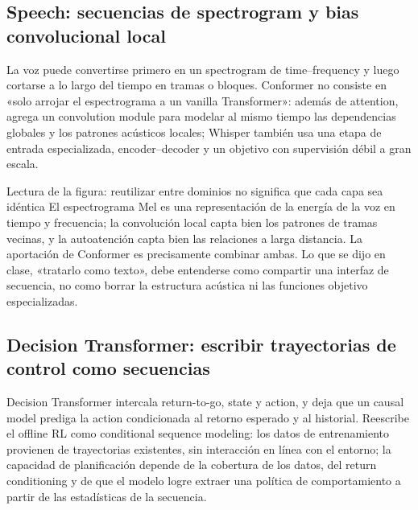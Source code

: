\subsection{Speech: secuencias de spectrogram y bias convolucional local}

La voz puede convertirse primero en un spectrogram de time--frequency y luego cortarse a lo largo del tiempo en tramas o bloques. Conformer no consiste en «solo arrojar el espectrograma a un vanilla Transformer»: además de attention, agrega un convolution module para modelar al mismo tiempo las dependencias globales y los patrones acústicos locales; Whisper también usa una etapa de entrada especializada, encoder--decoder y un objetivo con supervisión débil a gran escala.


\begin{knowledgebox}{Lectura de la figura: reutilizar entre dominios no significa que cada capa sea idéntica}
El espectrograma Mel es una representación de la energía de la voz en tiempo y frecuencia; la convolución local capta bien los patrones de tramas vecinas, y la autoatención capta bien las relaciones a larga distancia. La aportación de Conformer es precisamente combinar ambas. Lo que se dijo en clase, «tratarlo como texto», debe entenderse como compartir una interfaz de secuencia, no como borrar la estructura acústica ni las funciones objetivo especializadas.
\end{knowledgebox}

\subsection{Decision Transformer: escribir trayectorias de control como secuencias}

Decision Transformer intercala return-to-go, state y action, y deja que un causal model prediga la action condicionada al retorno esperado y al historial. Reescribe el offline RL como conditional sequence modeling: los datos de entrenamiento provienen de trayectorias existentes, sin interacción en línea con el entorno; la capacidad de planificación depende de la cobertura de los datos, del return conditioning y de que el modelo logre extraer una política de comportamiento a partir de las estadísticas de la secuencia.


